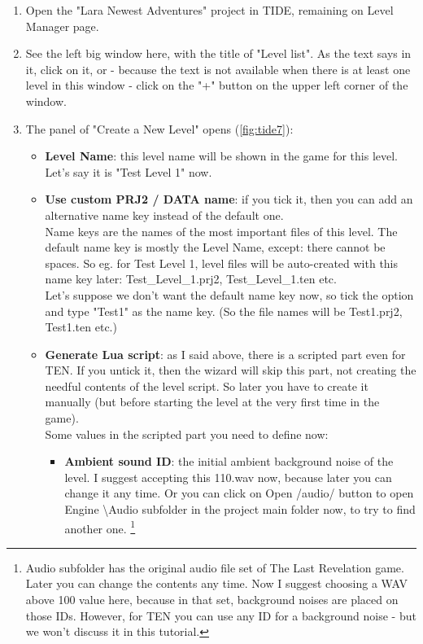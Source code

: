 \begin{enumerate}
    \item Open the "Lara Newest Adventures" project in TIDE, remaining on Level Manager page.
    \item See the left big window here, with the title of "Level list". As the text says in it, click on it, or - because the text is not available when there is at least one level in this window - click on the "+" button on the upper left corner of the window.
    \item The panel of "Create a New Level" opens (\ref{fig:tide7}):
    \begin{itemize}
        \item \textbf{Level Name}: this level name will be shown in the game for this level. Let's say it is "Test Level 1" now.
        \item \textbf{Use custom PRJ2 / DATA name}: if you tick it, then you can add an alternative name key instead of the default one. \\ Name keys are the names of the most important files of this level. The default name key is mostly the Level Name, except: there cannot be spaces. So eg. for Test Level 1, level files will be auto-created with this name key later: Test\_Level\_1.prj2, Test\_Level\_1.ten etc. \\ Let's suppose we don't want the default name key now, so tick the option and type "Test1" as the name key. (So the file names will be Test1.prj2, Test1.ten etc.)
        \item \textbf{Generate Lua script}: as I said above, there is a scripted part even for TEN. If you untick it, then the wizard will skip this part, not creating the needful contents of the level script. So later you have to create it manually (but before starting the level at the very first time in the game).
        \\ Some values in the scripted part you need to define now:
\begin{itemize}
    \item \textbf{Ambient sound ID}: the initial ambient background noise of the level. I suggest accepting this 110.wav now, because later you can change it any time. Or you can click on Open /audio/ button to open Engine \textbackslash Audio subfolder in the project main folder now, to try to find another one. \footnote{Audio subfolder has the original audio file set of The Last Revelation game. Later you can change the contents any time. Now I suggest choosing a WAV above 100 value here, because in that set, background noises are placed on those IDs. However, for TEN you can use any ID for a background noise - but we won't discuss it in this tutorial.}

\end{itemize}
\end{itemize}
\end{enumerate}
